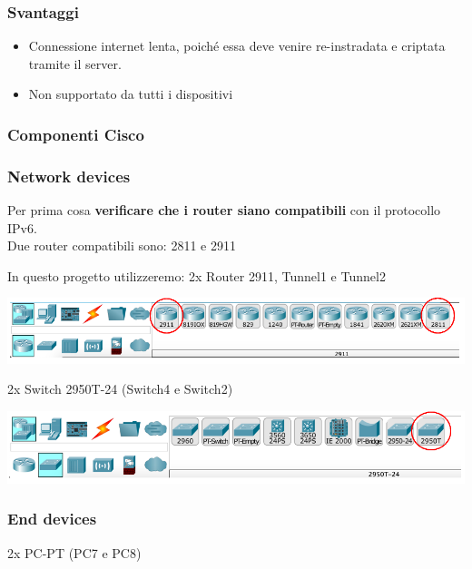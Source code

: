 \subsubsection{Svantaggi}
\begin{itemize}
    \item Connessione internet lenta, poiché essa deve venire re-instradata e criptata tramite il server.
    \item Non supportato da tutti i dispositivi
\end{itemize}

\subsubsection{Componenti Cisco}

\subsubsection*{Network devices}
Per prima cosa \textbf{verificare che i router siano compatibili} con il protocollo IPv6.\\
Due router compatibili sono: 2811 e 2911

In questo progetto utilizzeremo: 2x Router 2911, Tunnel1 e Tunnel2

\begin{center}
    \includegraphics[width=\linewidth]{images/07.routing-sicurezza/tunneling/01.routers.png}
\end{center}

2x Switch 2950T-24 (Switch4 e Switch2)

\begin{center}
    \includegraphics[width=\linewidth]{images/07.routing-sicurezza/tunneling/02.png}
\end{center}

\subsubsection*{End devices}
2x PC-PT (PC7 e PC8)

